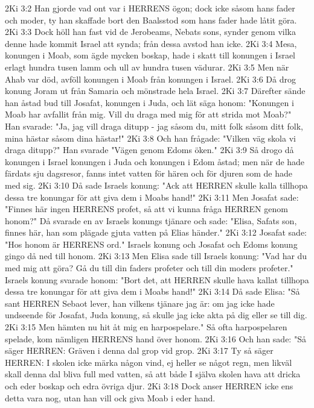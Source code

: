 2Ki 3:2  Han gjorde vad ont var i HERRENS ögon; dock icke såsom hans fader och moder, ty han skaffade bort den Baalsstod som hans fader hade låtit göra.
2Ki 3:3  Dock höll han fast vid de Jerobeams, Nebats sons, synder genom vilka denne hade kommit Israel att synda; från dessa avstod han icke.
2Ki 3:4  Mesa, konungen i Moab, som ägde mycken boskap, hade i skatt till konungen i Israel erlagt hundra tusen lamm och ull av hundra tusen vädurar.
2Ki 3:5  Men när Ahab var död, avföll konungen i Moab från konungen i Israel.
2Ki 3:6  Då drog konung Joram ut från Samaria och mönstrade hela Israel.
2Ki 3:7  Därefter sände han åstad bud till Josafat, konungen i Juda, och lät säga honom: "Konungen i Moab har avfallit från mig. Vill du draga med mig för att strida mot Moab?" Han svarade: "Ja, jag vill draga ditupp - jag såsom du, mitt folk såsom ditt folk, mina hästar såsom dina hästar!"
2Ki 3:8  Och han frågade: "Vilken väg skola vi draga ditupp?" Han svarade "Vägen genom Edoms öken."
2Ki 3:9  Så drogo då konungen i Israel konungen i Juda och konungen i Edom åstad; men när de hade färdats sju dagsresor, fanns intet vatten för hären och för djuren som de hade med sig.
2Ki 3:10  Då sade Israels konung: "Ack att HERREN skulle kalla tillhopa dessa tre konungar för att giva dem i Moabs hand!"
2Ki 3:11  Men Josafat sade: "Finnes här ingen HERRENS profet, så att vi kunna fråga HERREN genom honom?" Då svarade en av Israels konungs tjänare och sade: "Elisa, Safats son, finnes här, han som plägade gjuta vatten på Elias händer."
2Ki 3:12  Josafat sade: "Hos honom är HERRENS ord." Israels konung och Josafat och Edoms konung gingo då ned till honom.
2Ki 3:13  Men Elisa sade till Israels konung: "Vad har du med mig att göra? Gå du till din faders profeter och till din moders profeter." Israels konung svarade honom: "Bort det, att HERREN skulle hava kallat tillhopa dessa tre konungar för att giva dem i Moabs hand!"
2Ki 3:14  Då sade Elisa: "Så sant HERREN Sebaot lever, han vilkens tjänare jag är: om jag icke hade undseende för Josafat, Juda konung, så skulle jag icke akta på dig eller se till dig.
2Ki 3:15  Men hämten nu hit åt mig en harpospelare." Så ofta harpospelaren spelade, kom nämligen HERRENS hand över honom.
2Ki 3:16  Och han sade: "Så säger HERREN: Gräven i denna dal grop vid grop.
2Ki 3:17  Ty så säger HERREN: I skolen icke märka någon vind, ej heller se något regn, men likväl skall denna dal bliva full med vatten, så att både I själva skolen hava att dricka och eder boskap och edra övriga djur.
2Ki 3:18  Dock anser HERREN icke ens detta vara nog, utan han vill ock giva Moab i eder hand.

